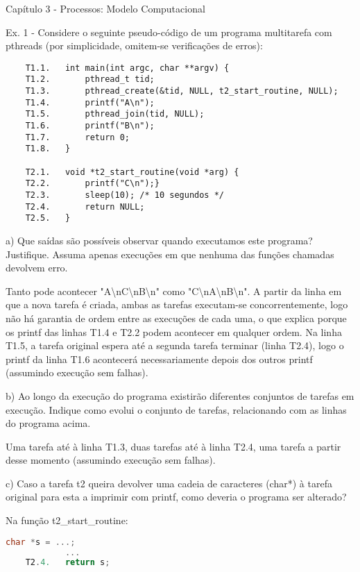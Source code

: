 \documentclass[11pt]{article}
\begin{document}
Capítulo 3 - Processos: Modelo Computacional

Ex. 1 - Considere o seguinte pseudo-código de um programa multitarefa com pthreads (por simplicidade, omitem-se verificações de erros):

\begin{lstlisting}
    T1.1.   int main(int argc, char **argv) {
    T1.2.       pthread_t tid;
    T1.3.       pthread_create(&tid, NULL, t2_start_routine, NULL);
    T1.4.       printf("A\n");
    T1.5.       pthread_join(tid, NULL);
    T1.6.       printf("B\n");
    T1.7.       return 0;
    T1.8.   }

    T2.1.   void *t2_start_routine(void *arg) {
    T2.2.       printf("C\n");}
    T2.3.       sleep(10); /* 10 segundos */
    T2.4.       return NULL;
    T2.5.   } 
\end{lstlisting}

a) Que saídas são possíveis observar quando executamos este programa? Justifique. Assuma apenas execuções em que nenhuma das funções chamadas devolvem erro.

Tanto pode acontecer "A\textbackslash nC\textbackslash nB\textbackslash n" como "C\textbackslash nA\textbackslash nB\textbackslash n". A partir da linha em que a nova tarefa é criada, ambas as tarefas executam-se concorrentemente, logo não há garantia de ordem entre as execuções de cada uma, o que explica porque os printf das linhas T1.4 e T2.2 podem acontecer em qualquer ordem. Na linha T1.5, a tarefa original espera até a segunda tarefa terminar (linha T2.4), logo o printf da linha T1.6 acontecerá necessariamente depois dos outros printf (assumindo execução sem falhas).

b) Ao longo da execução do programa existirão diferentes conjuntos de tarefas em execução. Indique como evolui o conjunto de tarefas, relacionando com as linhas do programa acima.

Uma tarefa até à linha T1.3, duas tarefas até à linha T2.4, uma tarefa a partir desse momento (assumindo execução sem falhas).

c) Caso a tarefa t2 queira devolver uma cadeia de caracteres (char*) à tarefa original para esta a imprimir com printf, como deveria o programa ser alterado?

Na função t2\_start\_routine:

\begin{lstlisting}[language=C]
            char *s = ...;
            ...
    T2.4.   return s;
\end{lstlisting}
\end{document}
